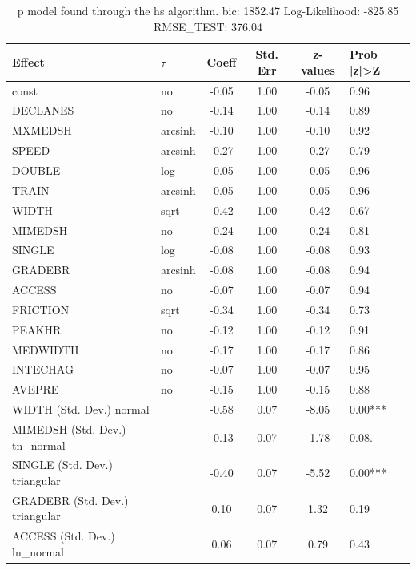 \begin{table}
	\caption{p model found through the hs algorithm. bic: 1852.47 Log-Likelihood: -825.85 RMSE_TEST: 376.04}
	\begin{center}
		\begin{tabular}{|l|l|c|c|c|l|}
			\hline
			Effect & $\tau$ & Coeff & Std. Err & z-values & Prob |z|>Z \\
			\hline
			const & no & -0.05 & 1.00 & -0.05 & 0.96 \\
			\hline
			DECLANES & no & -0.14 & 1.00 & -0.14 & 0.89 \\
			\hline
			MXMEDSH & arcsinh & -0.10 & 1.00 & -0.10 & 0.92 \\
			\hline
			SPEED & arcsinh & -0.27 & 1.00 & -0.27 & 0.79 \\
			\hline
			DOUBLE & log & -0.05 & 1.00 & -0.05 & 0.96 \\
			\hline
			TRAIN & arcsinh & -0.05 & 1.00 & -0.05 & 0.96 \\
			\hline
			WIDTH & sqrt & -0.42 & 1.00 & -0.42 & 0.67 \\
			\hline
			MIMEDSH & no & -0.24 & 1.00 & -0.24 & 0.81 \\
			\hline
			SINGLE & log & -0.08 & 1.00 & -0.08 & 0.93 \\
			\hline
			GRADEBR & arcsinh & -0.08 & 1.00 & -0.08 & 0.94 \\
			\hline
			ACCESS & no & -0.07 & 1.00 & -0.07 & 0.94 \\
			\hline
			FRICTION & sqrt & -0.34 & 1.00 & -0.34 & 0.73 \\
			\hline
			PEAKHR & no & -0.12 & 1.00 & -0.12 & 0.91 \\
			\hline
			MEDWIDTH & no & -0.17 & 1.00 & -0.17 & 0.86 \\
			\hline
			INTECHAG & no & -0.07 & 1.00 & -0.07 & 0.95 \\
			\hline
			AVEPRE & no & -0.15 & 1.00 & -0.15 & 0.88 \\
			\hline
			WIDTH (Std. Dev.) normal &  & -0.58 & 0.07 & -8.05 & 0.00*** \\
			\hline
			MIMEDSH (Std. Dev.) tn_normal &  & -0.13 & 0.07 & -1.78 & 0.08. \\
			\hline
			SINGLE (Std. Dev.) triangular &  & -0.40 & 0.07 & -5.52 & 0.00*** \\
			\hline
			GRADEBR (Std. Dev.) triangular &  & 0.10 & 0.07 & 1.32 & 0.19 \\
			\hline
			ACCESS (Std. Dev.) ln_normal &  & 0.06 & 0.07 & 0.79 & 0.43 \\
			\hline

\end{tabular}
\end{center}
\end{table}

